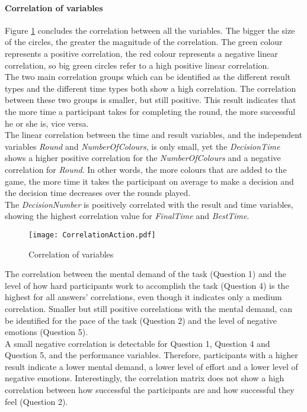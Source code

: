 \paragraph{Correlation of variables}
Figure \ref{Correlation} concludes the correlation between all the variables. The bigger the size of the circles, the greater the magnitude of the correlation. The green colour represents a positive correlation, the red colour represents a negative linear correlation, so big green circles refer to a high positive linear correlation.\\
The two main correlation groups which can be identified as the different result types and the different time types both show a high correlation. The correlation between these two groups is smaller, but still positive. This result indicates that the more time a participant takes for completing the round, the more successful he or she is, vice versa.\\
The linear correlation between the time and result variables, and the independent variables \textit{Round} and \textit{NumberOfColours}, is only small, yet the \textit{DecisionTime} shows a higher positive correlation for the \textit{NumberOfColours} and a negative correlation for \textit{Round}. In other words, the more colours that are added to the game, the more time it takes the participant on average to make a decision and the decision time decreases over the rounds played.\\
The \textit{DecisionNumber} is positively correlated with the result and time variables, showing the highest correlation value for \textit{FinalTime} and \textit{BestTime}.

 \begin{figure}[htbp] %
\begin{center} %
  \texttt{[image: CorrelationAction.pdf]}
  \caption{Correlation of variables}
  \label{Correlation}
\end{center}
\end{figure}

The correlation between the mental demand of the task (Question 1) and the level of how hard participants work to accomplish the task (Question 4) is the highest for all answers' correlations, even though it indicates only a medium correlation. Smaller but still positive correlations with the mental demand, can be identified for the pace of the task (Question 2) and the level of negative emotions (Question 5).\\
A small negative correlation is detectable for Question 1, Question 4 and Question 5, and the performance variables. Therefore, participants with a higher result indicate a lower mental demand, a lower level of effort and a lower level of negative emotions. Interestingly, the correlation matrix does not show a high correlation between how successful the participants are and how successful they feel (Question 2). 
